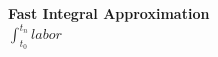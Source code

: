 \documentclass{article}
\begin{document}
\begin{center}
\textbf{ Fast Integral Approximation }\\
$\int_{t_0}^{t_n}labor $ 
\end{center}
\end{document}
